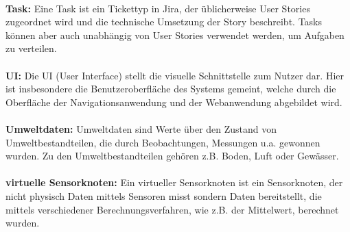 \\
\textbf{Task:} Eine Task ist ein Tickettyp in Jira, der üblicherweise User Stories zugeordnet wird und die technische Umsetzung der Story beschreibt. Tasks können aber auch unabhängig von User Stories verwendet werden, um Aufgaben zu verteilen.  \\
\\
\textbf{UI:} Die UI (User Interface) stellt die visuelle Schnittstelle zum Nutzer dar. Hier ist insbesondere die Benutzeroberfläche des Systems gemeint, welche durch die Oberfläche der Navigationsanwendung und der Webanwendung abgebildet wird.\\
\\
\textbf{Umweltdaten:} Umweltdaten sind Werte über den Zustand von Umweltbestandteilen, die durch Beobachtungen, Messungen u.a. gewonnen wurden.
Zu den Umweltbestandteilen gehören z.B. Boden, Luft oder Gewässer.\\
\\
\textbf{virtuelle Sensorknoten:} Ein virtueller Sensorknoten ist ein Sensorknoten, der nicht physisch Daten mittels Sensoren misst sondern Daten bereitstellt, die mittels verschiedener Berechnungsverfahren, wie z.B. der Mittelwert, berechnet wurden. \\
